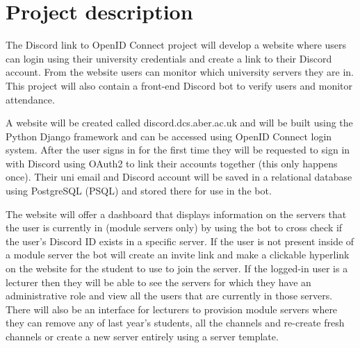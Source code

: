 \documentclass[11pt,fleqn,twoside]{article}
\begin{document}

\mmp

\setcounter{tocdepth}{3} %


\section{Project description}
The Discord\cite{discord} link to OpenID Connect\cite{OpenID} project will develop a website where users can login using their university credentials and create a link to their Discord account. From the website users can monitor which university servers they are in. This project will also contain a front-end Discord bot to verify users and monitor attendance. \bigskip

A website will be created called discord.dcs.aber.ac.uk and will be built using the Python Django\cite{Django} framework and can be accessed using OpenID Connect login system. After the user signs in for the first time they will be requested to sign in with Discord using OAuth2 to link their accounts together (this only happens once). Their uni email and  Discord account will be saved in a relational database using PostgreSQL\cite{psql} (PSQL) and stored there for use in the bot. \bigskip

The website will offer a dashboard that displays information on the servers that the user is currently in (module servers only) by using the bot to cross check if the user's Discord ID exists in a specific server. If the user is not present inside of a module server the bot will create an invite link and make a clickable hyperlink on the website for the student to use to join the server. If the logged-in user is a lecturer then they will be able to see the servers for which they have an administrative role and view all the users that are currently in those servers. There will also be an interface for lecturers to provision module servers where they can remove any of last year's students, all the channels and re-create fresh channels or create a new server entirely using a server template. \bigskip
\end{document}
